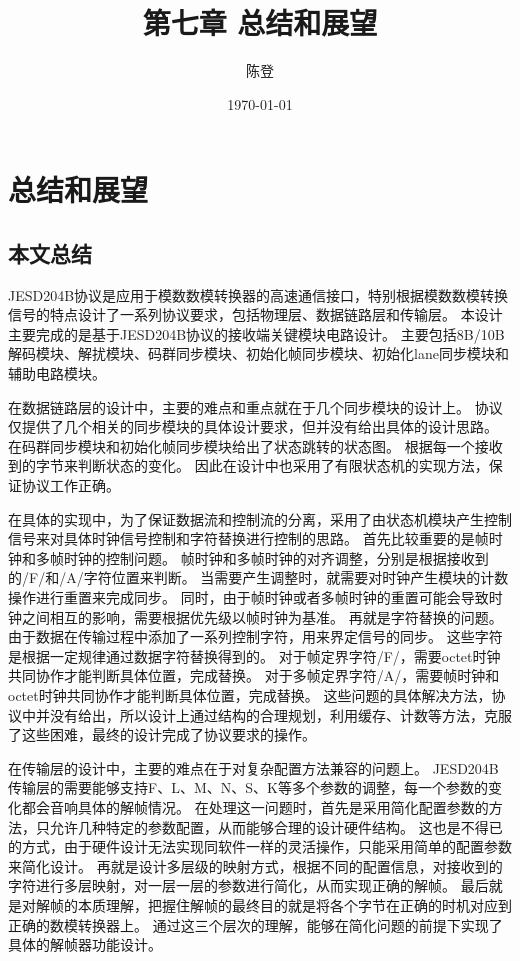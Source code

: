 \documentclass[UTF8]{ctexart}
\title{第七章 总结和展望}
\author{陈登}
\date{\today}
\begin{document}
\section{总结和展望}

\subsection{本文总结}

JESD204B协议是应用于模数数模转换器的高速通信接口，特别根据模数数模转换信号的特点设计了一系列协议要求，包括物理层、数据链路层和传输层。
本设计主要完成的是基于JESD204B协议的接收端关键模块电路设计。
主要包括8B/10B解码模块、解扰模块、码群同步模块、初始化帧同步模块、初始化lane同步模块和辅助电路模块。

在数据链路层的设计中，主要的难点和重点就在于几个同步模块的设计上。
协议仅提供了几个相关的同步模块的具体设计要求，但并没有给出具体的设计思路。
在码群同步模块和初始化帧同步模块给出了状态跳转的状态图。
根据每一个接收到的字节来判断状态的变化。
因此在设计中也采用了有限状态机的实现方法，保证协议工作正确。

在具体的实现中，为了保证数据流和控制流的分离，采用了由状态机模块产生控制信号来对具体时钟信号控制和字符替换进行控制的思路。
首先比较重要的是帧时钟和多帧时钟的控制问题。
帧时钟和多帧时钟的对齐调整，分别是根据接收到的/F/和/A/字符位置来判断。
当需要产生调整时，就需要对时钟产生模块的计数操作进行重置来完成同步。
同时，由于帧时钟或者多帧时钟的重置可能会导致时钟之间相互的影响，需要根据优先级以帧时钟为基准。
再就是字符替换的问题。
由于数据在传输过程中添加了一系列控制字符，用来界定信号的同步。
这些字符是根据一定规律通过数据字符替换得到的。
对于帧定界字符/F/，需要octet时钟共同协作才能判断具体位置，完成替换。
对于多帧定界字符/A/，需要帧时钟和octet时钟共同协作才能判断具体位置，完成替换。
这些问题的具体解决方法，协议中并没有给出，所以设计上通过结构的合理规划，利用缓存、计数等方法，克服了这些困难，最终的设计完成了协议要求的操作。

在传输层的设计中，主要的难点在于对复杂配置方法兼容的问题上。
JESD204B传输层的需要能够支持F、L、M、N、S、K等多个参数的调整，每一个参数的变化都会音响具体的解帧情况。
在处理这一问题时，首先是采用简化配置参数的方法，只允许几种特定的参数配置，从而能够合理的设计硬件结构。
这也是不得已的方式，由于硬件设计无法实现同软件一样的灵活操作，只能采用简单的配置参数来简化设计。
再就是设计多层级的映射方式，根据不同的配置信息，对接收到的字符进行多层映射，对一层一层的参数进行简化，从而实现正确的解帧。
最后就是对解帧的本质理解，把握住解帧的最终目的就是将各个字节在正确的时机对应到正确的数模转换器上。
通过这三个层次的理解，能够在简化问题的前提下实现了具体的解帧器功能设计。
\end{document}
